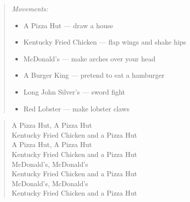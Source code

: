 
\begin{quote}\small
\textit{Movements:}
\begin{itemize}
    \setlength{\itemsep}{0pt}
    \setlength{\parskip}{0pt}
    \setlength{\parsep}{0pt}
    \item A Pizza Hut — draw a house
    \item Kentucky Fried Chicken — flap wings and shake hips
    \item McDonald's — make arches over your head
    \item A Burger King — pretend to eat a hamburger
    \item Long John Silver's — sword fight
    \item Red Lobster — make lobster claws
\end{itemize}
\end{quote}

\begin{verse}
A Pizza Hut, A Pizza Hut \\
Kentucky Fried Chicken and a Pizza Hut \\

A Pizza Hut, A Pizza Hut \\
Kentucky Fried Chicken and a Pizza Hut \\[0.5em]

McDonald's, McDonald's \\
Kentucky Fried Chicken and a Pizza Hut \\

McDonald's, McDonald's \\
Kentucky Fried Chicken and a Pizza Hut \\
\end{verse}
